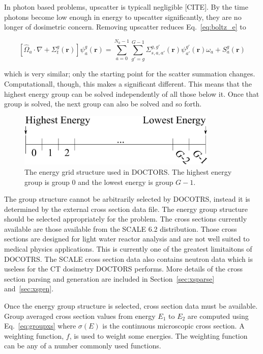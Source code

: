 In photon based problems, upscatter is typicall negligible [CITE]. By the time photons become low enough in energy to upscatter significantly, they are no longer of dosimetric concern. Removing upscatter reduces Eq.~\ref{eq:boltz_e} to

\begin{equation} \label{eq:boltz_e2}
\left[ \hat{\Omega}_a \cdot \nabla + \Sigma_t^g(\boldsymbol{r}) \right]
\psi_{a}^{g}(\boldsymbol{r}) = 
\sum_{a=0}^{N_a-1} \sum_{g'=g}^{G-1} \Sigma_{s, a, a'}^{g, g'}(\boldsymbol{r}) \psi_{a'}^{g'}(\boldsymbol{r}) \omega_a + S_a^g(\boldsymbol{r})
\end{equation}

\noindent
which is very similar; only the starting point for the scatter summation changes. Computationall, though, this makes a significant different. This means that the highest energy group can be solved independently of all those below it. Once that group is solved, the next group can also be solved and so forth.

\begin{figure}[tb]
  \begin{center}
   \includegraphics[width=3.75in]{figs/energy_groups}
  \end{center}
  \caption{The energy grid structure used in DOCTORS. The highest energy group is group 0 and the lowest energy is group $G-1$.}
\label{fig:energy_groups}
\end{figure}

The group structure cannot be arbitrarily selected by DOCOTRS, instead it is determined by the external cross section data file. The energy group structure should be selected appropriately for the problem. The cross sections currently available are those available from the SCALE 6.2 distribution. Those cross sections are designed for light water reactor analysis and are not well suited to medical physics applications. This is currently one of the greatest limitaitons of DOCOTRS. The SCALE cross section data also contains neutron data which is useless for the CT dosimetry DOCTORS performs. More details of the cross section parsing and generation are included in Section~\ref{sec:xsparse} and~\ref{sec:xsgen}.

Once the energy group structure is selected, cross section data must be available. Group averaged cross section values from energy $E_1$ to $E_2$ are computed using Eq.~\ref{eq:groupxs} where $\sigma(E)$ is the continuous microscopic cross section. A weighting function, $f$, is used to weight some energies. The weighting function can be any of a number commonly used functions. 

